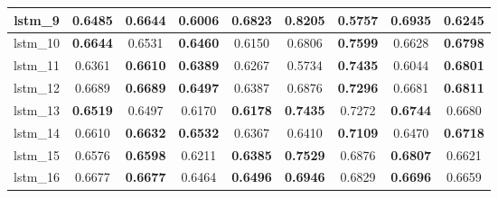 \begin{table}[hp]
\begin{tabular} {|c|c|c|c|c|c|c|c|c| }
        lstm\_9  & 0.6485                              & \textbf{0.6644}                     & 0.6006                              & \textbf{\cellcolor{green!50}0.6823} & \textbf{\cellcolor{green!50}0.8205} & 0.5757                              & \textbf{0.6935}                     & 0.6245                              \\ \hline
        lstm\_10 & \textbf{0.6644}                     & 0.6531                              & \textbf{0.6460}                     & 0.6150                              & 0.6806                              & \textbf{0.7599}                     & 0.6628                              & \textbf{0.6798}                     \\ \hline
        lstm\_11 & 0.6361                              & \textbf{0.6610}                     & \textbf{0.6389}                     & 0.6267                              & 0.5734                              & \textbf{0.7435}                     & 0.6044                              & \textbf{0.6801}                     \\ \hline
        lstm\_12 & 0.6689                              & \textbf{\cellcolor{green!50}0.6689} & \textbf{0.6497}                     & 0.6387                              & 0.6876                              & \textbf{0.7296}                     & 0.6681                              & \textbf{0.6811}                     \\ \hline
        lstm\_13 & \textbf{0.6519}                     & 0.6497                              & 0.6170                              & \textbf{0.6178}                     & \textbf{0.7435}                     & 0.7272                              & \textbf{0.6744}                     & 0.6680                              \\ \hline
        lstm\_14 & 0.6610                              & \textbf{0.6632}                     & \textbf{\cellcolor{green!50}0.6532} & 0.6367                              & 0.6410                              & \textbf{0.7109}                     & 0.6470                              & \textbf{0.6718}                     \\ \hline
        lstm\_15 & 0.6576                              & \textbf{0.6598}                     & 0.6211                              & \textbf{0.6385}                     & \textbf{0.7529}                     & 0.6876                              & \textbf{0.6807}                     & 0.6621                              \\ \hline
        lstm\_16 & 0.6677                              & \textbf{0.6677}                     & 0.6464                              & \textbf{0.6496}                     & \textbf{0.6946}                     & 0.6829                              & \textbf{0.6696}                     & 0.6659                              \\ \hline

\end{tabular}
\end{table}
